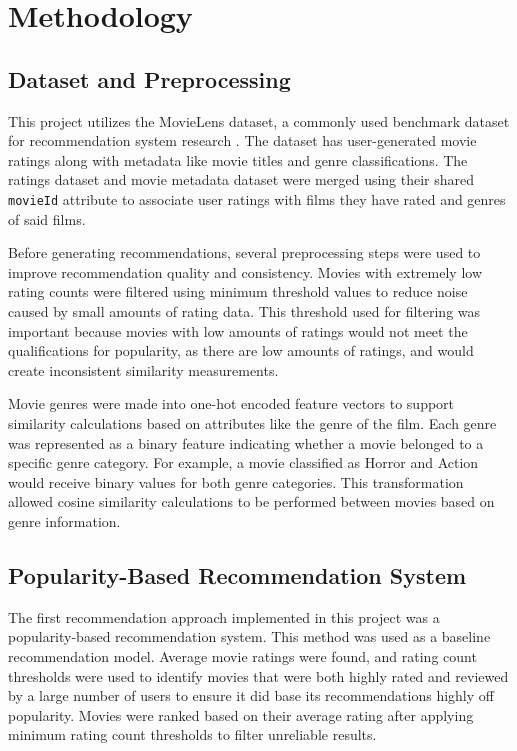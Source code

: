 \documentclass{article}
\begin{document}
\section{Methodology}
\subsection{Dataset and Preprocessing}

This project utilizes the MovieLens dataset, a commonly used benchmark dataset for recommendation system research \cite{harper2015movielens}. The dataset has user-generated movie ratings along with metadata like movie titles and genre classifications. The ratings dataset and movie metadata dataset were merged using their shared \texttt{movieId} attribute to associate user ratings with films they have rated and genres of said films.

Before generating recommendations, several preprocessing steps were used to improve recommendation quality and consistency. Movies with extremely low rating counts were filtered using minimum threshold values to reduce noise caused by small amounts of rating data. This threshold used for filtering was important because movies with low amounts of ratings would not meet the qualifications for popularity, as there are low amounts of ratings, and would create inconsistent similarity measurements.

Movie genres were made into one-hot encoded feature vectors to support similarity calculations based on attributes like the genre of the film. Each genre was represented as a binary feature indicating whether a movie belonged to a specific genre category. For example, a movie classified as Horror and Action would receive binary values for both genre categories. This transformation allowed cosine similarity calculations to be performed between movies based on genre information.

\subsection{Popularity-Based Recommendation System}

The first recommendation approach implemented in this project was a popularity-based recommendation system. This method was used as a baseline recommendation model. Average movie ratings were found, and rating count thresholds were used to identify movies that were both highly rated and reviewed by a large number of users to ensure it did base its recommendations highly off popularity. Movies were ranked based on their average rating after applying minimum rating count thresholds to filter unreliable results.
\end{document}
